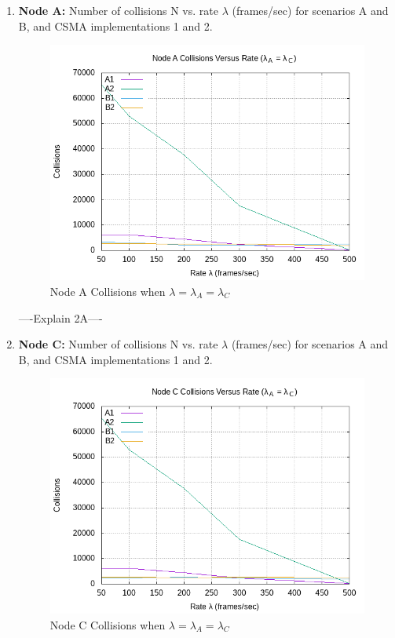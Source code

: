 \documentclass[12pt]{article}
\begin{document}
    \begin{enumerate}
    
        \item {
            {\bf Node A:} Number of collisions N vs. rate \(\lambda{}\) (frames/sec) for scenarios A and B, and CSMA implementations 1 and 2.
            
            \begin{figure}[!htb]
                \centering
                \includegraphics[width=5in]{2A.png}
                \caption{Node A Collisions when \(\lambda{} = \lambda{}_A = \lambda{}_C\) }
                \label{fig:2A}
            \end{figure}

            ----Explain 2A----
        }    
    
    
\clearpage  
        \item {
            {\bf Node C:} Number of collisions N vs. rate \(\lambda{}\) (frames/sec) for scenarios A and B, and CSMA implementations 1 and 2.
            
            \begin{figure}[!htb]
                \centering
                \includegraphics[width=5in]{2B.png}
                \caption{Node C Collisions when \(\lambda{} = \lambda{}_A = \lambda{}_C\) }
                \label{fig:2B}
            \end{figure}

}
\end{enumerate}
\end{document}
